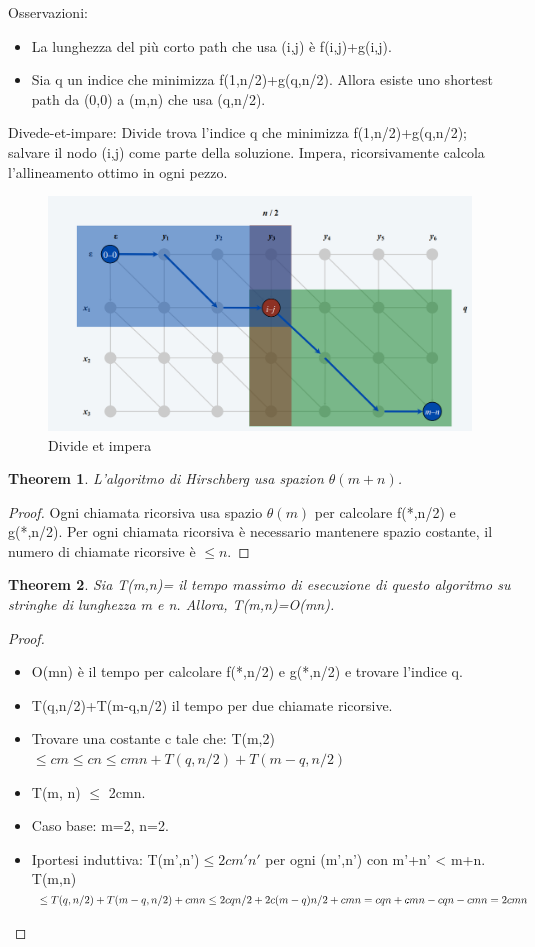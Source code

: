 \documentclass{article}
\newtheorem{theorem}{Theorem}[subsection]
\begin{document}
Osservazioni:
\begin{itemize}
    \item La lunghezza del più corto path che usa (i,j) è f(i,j)+g(i,j).
    \item Sia q un indice che minimizza f(1,n/2)+g(q,n/2). Allora esiste uno shortest path da (0,0) a (m,n) che usa (q,n/2).
\end{itemize}
Divede-et-impare: Divide trova l'indice q che minimizza f(1,n/2)+g(q,n/2); salvare il nodo (i,j) come parte della soluzione. Impera, ricorsivamente calcola l'allineamento ottimo in ogni pezzo.
\begin{figure}[H]
    \centering
    \includegraphics[width=0.5\linewidth]{hirschbergDivEtImp.png}
    \caption{Divide et impera}
    \label{fig:enter-label}
\end{figure}
\begin{theorem}
    L'algoritmo di Hirschberg usa spazion $\theta(m+n)$.
\end{theorem}
\begin{proof}
    Ogni chiamata ricorsiva usa spazio $\theta(m)$ per calcolare f(*,n/2) e g(*,n/2). Per ogni chiamata ricorsiva è necessario mantenere spazio costante, il numero di chiamate ricorsive è $\leq n$.
\end{proof}
\begin{theorem}
    Sia T(m,n)= il tempo massimo di esecuzione di questo algoritmo su stringhe di lunghezza m e n. Allora, T(m,n)=O(mn).
\end{theorem}
\begin{proof}
    \begin{itemize}
        \item O(mn) è il tempo per calcolare f(*,n/2) e g(*,n/2) e trovare l'indice q.
        \item T(q,n/2)+T(m-q,n/2) il tempo per due chiamate ricorsive.
        \item Trovare una costante c tale che: T(m,2)$\leq cm \leq cn \leq cmn+T(q,n/2)+T(m-q,n/2)$
        \item T(m, n) $\leq$ 2cmn.
        \item Caso base: m=2, n=2.
        \item Iportesi induttiva: T(m',n')$\leq 2cm'n'$ per ogni (m',n') con m'+n' < m+n.\\
        T(m,n)$\leq T(q,n/2)+T(m-q,n/2)+cmn\\ \leq 2cqn/2 + 2c(m-q)n/2 +cmn\\ =cqn+cmn-cqn-cmn\\ =2cmn$
    \end{itemize}
\end{proof}
\end{document}
